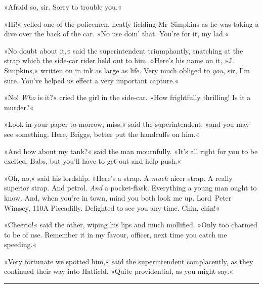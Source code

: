 »Afraid so, sir. Sorry to trouble you.«

»Hi!« yelled one of the policemen, neatly fielding Mr~Simpkins as he was taking a dive over the back of the car. »No use doin' that. You're for it, my lad.«

»No doubt about it,« said the superintendent triumphantly, snatching at the strap which the side-car rider held out to him. »Here's his name on it, »J. Simpkins,« written on in ink as large as life. Very much obliged to \textit{you}, sir, I'm sure. You've helped us effect a very important capture.«

»No! \textit{Who} is it?« cried the girl in the side-car. »How frightfully thrilling! Is it a murder?«

»Look in your paper to-morrow, miss,« said the superintendent, »and you may see something. Here, Briggs, better put the handcuffs on him.«

»And how about my tank?« said the man mournfully. »It's all right for you to be excited, Babs, but you'll have to get out and help push.«

»Oh, no,« said his lordship. »Here's a strap. A \textit{much} nicer strap. A really superior strap. And petrol. \textit{And} a pocket-flask. Everything a young man ought to know. And, when you're in town, mind you both look me up. Lord~Peter Wimsey, 110A Piccadilly. Delighted to see you any time. Chin, chin!«

»Cheerio!« said the other, wiping his lips and much mollified. »Only too charmed to be of use. Remember it in my favour, officer, next time you catch me speeding.«

»Very fortunate we spotted him,« said the superintendent complacently, as they continued their way into Hatfield. »Quite providential, as you might say.«

\noindent\hfil\rule{0.5\textwidth}{.4pt}\hfil 

